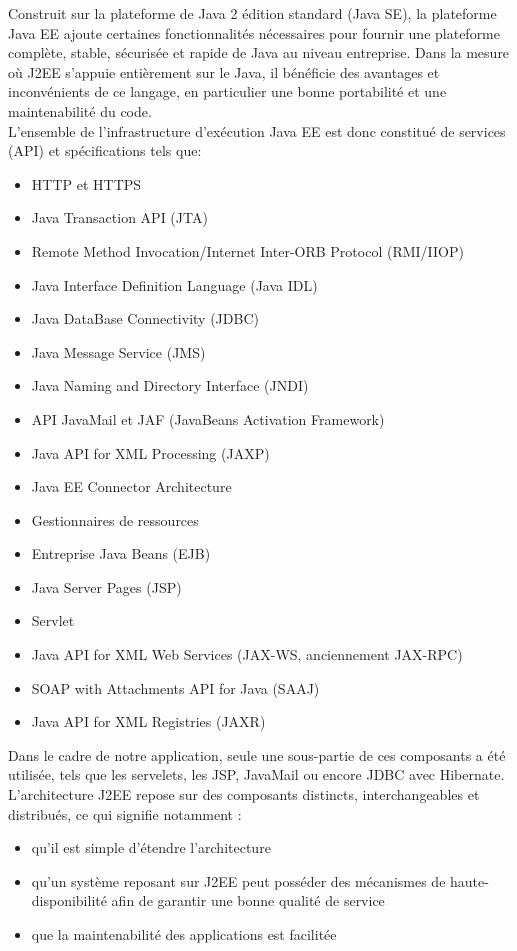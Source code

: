 Construit sur la plateforme de Java 2 édition standard (Java SE), la plateforme Java EE ajoute certaines fonctionnalités nécessaires pour fournir une plateforme complète, stable, sécurisée et rapide de Java au niveau entreprise. 
Dans la mesure où J2EE s'appuie entièrement sur le Java, il bénéficie des avantages et inconvénients de ce langage, en particulier une bonne portabilité et une maintenabilité du code.\\
\newline
\indent
L'ensemble de l'infrastructure d'exécution Java EE est donc constitué de services (API) et spécifications tels que:
\begin{itemize}
\item HTTP et HTTPS
\item Java Transaction API (JTA)
\item Remote Method Invocation/Internet Inter-ORB Protocol (RMI/IIOP)
\item Java Interface Definition Language (Java IDL)
\item Java DataBase Connectivity (JDBC)
\item Java Message Service (JMS)
\item Java Naming and Directory Interface (JNDI)
\item API JavaMail et JAF (JavaBeans Activation Framework)
\item Java API for XML Processing (JAXP)
\item Java EE Connector Architecture
\item Gestionnaires de ressources
\item Entreprise Java Beans (EJB)
\item Java Server Pages (JSP)
\item Servlet
\item Java API for XML Web Services (JAX-WS, anciennement JAX-RPC)
\item SOAP with Attachments API for Java (SAAJ)
\item Java API for XML Registries (JAXR)\\
\end{itemize}
Dans le cadre de notre application, seule une sous-partie de ces composants a été utilisée, tels que les servelets, les JSP, JavaMail ou encore JDBC avec Hibernate.\\
\newline
\indent
L'architecture J2EE repose sur des composants distincts, interchangeables et distribués, ce qui signifie notamment :
\begin{itemize}
\item qu'il est simple d'étendre l'architecture 
\item qu'un système reposant sur J2EE peut posséder des mécanismes de haute-disponibilité afin de garantir une bonne qualité de service 
\item que la maintenabilité des applications est facilitée
\end{itemize}
\bigskip


